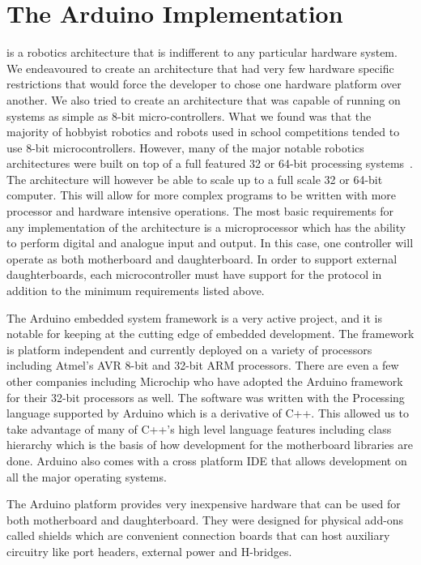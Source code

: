 

\section{The Arduino Implementation} %
\label{sec:the_arduino_implementation}
\xten is a robotics architecture that is indifferent to any particular hardware system. We endeavoured to create an architecture that had very few hardware specific restrictions that would force the developer to chose one hardware platform over another. We also tried to create an architecture that was capable of running on systems as simple as 8-bit micro-controllers. What we found was that the majority of hobbyist robotics and robots used in school competitions tended to use 8-bit microcontrollers. However, many of the major notable robotics architectures were built on top of a full featured 32 or 64-bit processing systems~\parencite{Elkady2012}. The architecture will however be able to scale up to a full scale 32 or 64-bit computer. This will allow for more complex programs to be written with more processor and hardware intensive operations. The most basic requirements for any implementation of the \xten architecture is a microprocessor which has the ability to perform digital and analogue input and output. In this case, one controller will operate as both motherboard and daughterboard. In order to support external daughterboards, each microcontroller must have support for the \iic protocol in addition to the minimum requirements listed above.

The Arduino embedded system framework is a very active project, and it is notable for keeping at the cutting edge of embedded development. The framework is platform independent and currently deployed on a variety of processors including Atmel's AVR 8-bit and 32-bit ARM processors. There are even a few other companies including Microchip who have adopted the Arduino framework for their 32-bit processors as well. 
The \xten software was written with the Processing language supported by Arduino which is a derivative of C++. This allowed us to take advantage of many of C++'s high level language features including class hierarchy which is the basis of how development for the motherboard libraries are done. Arduino also comes with a cross platform IDE that allows development on all the major operating systems.

The Arduino platform provides very inexpensive hardware that can be used for both motherboard and daughterboard. They were designed for physical add-ons called shields which are convenient connection boards that can host auxiliary circuitry like port headers, external power and H-bridges.


